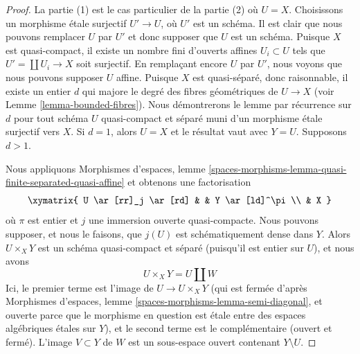 \begin{proof}
La partie (1) est le cas particulier de la partie (2) où $U = X$.
Choisissons un morphisme étale surjectif $U' \to U$, où $U'$ est un schéma.
Il est clair que nous pouvons remplacer $U$ par $U'$ et donc supposer que
$U$ est un schéma. Puisque $X$ est quasi-compact, il existe un nombre fini
d'ouverts affines $U_i \subset U$ tels que $U' = \coprod U_i \to X$ soit
surjectif. En remplaçant encore $U$ par $U'$, nous voyons que nous pouvons
supposer $U$ affine. Puisque $X$ est quasi-séparé, donc raisonnable, il existe
un entier $d$ qui majore le degré des fibres géométriques de $U \to X$
(voir Lemme \ref{lemma-bounded-fibres}).
Nous démontrerons le lemme par récurrence sur $d$ pour tout schéma $U$
quasi-compact et séparé muni d'un morphisme étale surjectif vers $X$.
Si $d = 1$, alors $U = X$ et le résultat vaut avec $Y = U$.
Supposons $d > 1$.

\medskip\noindent
Nous appliquons Morphismes d'espaces, lemme
\ref{spaces-morphisms-lemma-quasi-finite-separated-quasi-affine}
et obtenons une factorisation
$$
\xymatrix{
U \ar[rr]_j \ar[rd] & & Y \ar[ld]^\pi \\
& X
}
$$
où $\pi$ est entier et $j$ une immersion ouverte quasi-compacte. Nous
pouvons supposer, et nous le faisons, que $j(U)$ est schématiquement dense
dans $Y$. Alors $U \times_X Y$ est un schéma quasi-compact et séparé
(puisqu'il est entier sur $U$), et nous avons
$$
U \times_X Y = U \amalg W
$$
Ici, le premier terme est l'image de $U \to U \times_X Y$
(qui est fermée d'après
Morphismes d'espaces, lemme \ref{spaces-morphisms-lemma-semi-diagonal},
et ouverte parce que le morphisme en question est étale entre des espaces
algébriques étales sur $Y$), et le second terme est le complémentaire
(ouvert et fermé). L'image $V \subset Y$ de $W$ est un sous-espace ouvert
contenant $Y \setminus U$.


\end{proof}
